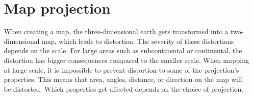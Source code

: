 \citep{LightIsLess} %





\section{Map projection}\label{ProjectionTheory}
When creating a map, the three-dimensional earth gets transformed into a two-dimensional map, which leads to distortion. The severity of these distortions depends on the scale. For large areas such as subcontinental or continental, the distortion has bigger consequences compared to the smaller scale. When mapping at large scale, it is impossible to prevent distortion to some of the projection’s properties. This means that area, angles, distance, or direction on the map will be distorted. Which properties get affected depends on the choice of projection. %

%
%
%
%
















